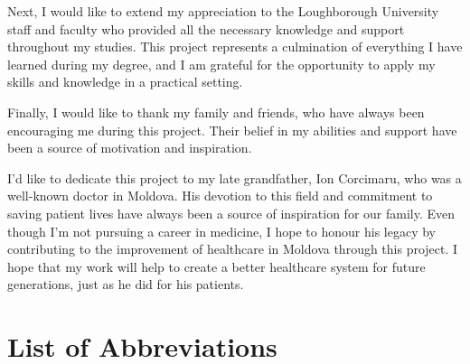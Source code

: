 Next, I would like to extend my appreciation to the Loughborough University staff and faculty who provided all the necessary knowledge and support throughout my studies. This project represents a culmination of everything I have learned during my degree, and I am grateful for the opportunity to apply my skills and knowledge in a practical setting.

Finally, I would like to thank my family and friends, who have always been encouraging me during this project. Their belief in my abilities and support have been a source of motivation and inspiration.

I'd like to dedicate this project to my late grandfather, Ion Corcimaru, who was a well-known doctor in Moldova. His devotion to this field and commitment to saving patient lives have always been a source of inspiration for our family. Even though I'm not pursuing a career in medicine, I hope to honour his legacy by contributing to the improvement of healthcare in Moldova through this project. I hope that my work will help to create a better healthcare system for future generations, just as he did for his patients.


\setcounter{tocdepth}{2}

\tableofcontents
{}

\listoffigures
{}

\listoftables
{}

\chapter*{List of Abbreviations}

